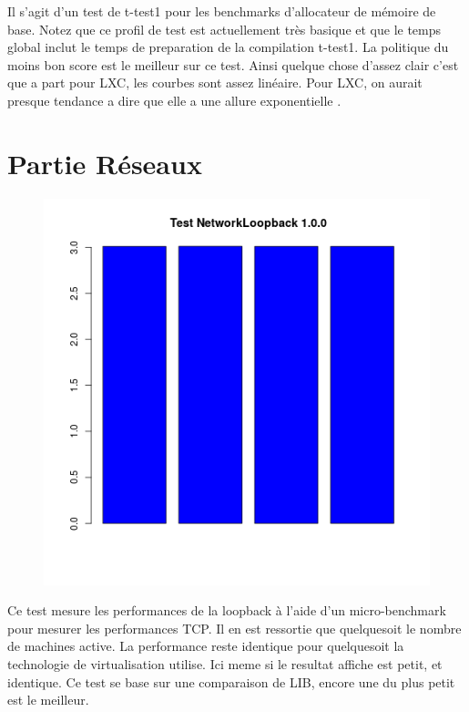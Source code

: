 Il s'agit d'un test de t-test1 pour les benchmarks d'allocateur de mémoire de base. Notez que ce profil de test est actuellement très basique et que le temps global inclut le temps de preparation de la compilation t-test1. La politique du moins bon score est le meilleur sur ce test.
Ainsi quelque chose d'assez clair c'est que a part pour LXC, les courbes sont assez linéaire. Pour LXC, on aurait presque tendance a dire que elle a une allure exponentielle .
\newpage
\section{Partie Réseaux }
\begin{figure}[h]
\centering
\includegraphics[scale=0.8]{resultats/netloop.png}
\end{figure}
Ce test mesure les performances de la loopback à l'aide d'un micro-benchmark pour mesurer les performances TCP.
Il en est ressortie que quelquesoit le nombre de machines active. La performance reste identique pour quelquesoit la technologie de virtualisation utilise. Ici meme si le resultat affiche est petit, et identique. Ce test se base sur une comparaison de LIB, encore une du plus petit est le meilleur.
\newpage
